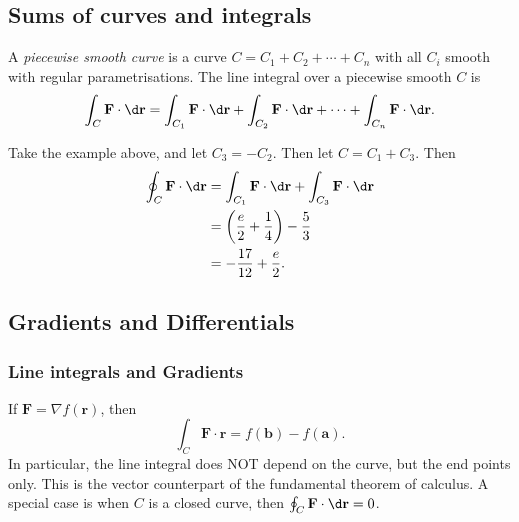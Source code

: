 \documentclass[a4paper]{article}
\begin{document}
\subsection{Sums of curves and integrals}
\begin{defi}
  A \emph{piecewise smooth curve} is a curve $C = C_1 + C_2 + \cdots + C_n$ with all $C_i$ smooth with regular parametrisations. The line integral over a piecewise smooth $C$ is
  \[
    \int_C \mathbf{F}\cdot \d \mathbf{r} = \int_{C_1} \mathbf{F}\cdot \d \mathbf{r} + \int_{C_2} \mathbf{F}\cdot \d \mathbf{r} + \cdots + \int_{C_n} \mathbf{F}\cdot \d \mathbf{r}.
  \]
\end{defi}

\begin{eg}
  Take the example above, and let $C_3 = -C_2$. Then let $C = C_1 + C_3$. Then
  \begin{align*}
    \oint _C \mathbf{F}\cdot \d \mathbf{r} &= \int_{C_1} \mathbf{F}\cdot \d \mathbf{r} + \int_{C_3} \mathbf{F}\cdot \d \mathbf{r}\\
    &= \left(\frac{e}{2} + \frac{1}{4}\right) - \frac{5}{3}\\
    &= -\frac{17}{12} + \frac{e}{2}.
  \end{align*}
  \begin{center}
  \end{center}
\end{eg}
\subsection{Gradients and Differentials}
\subsubsection{Line integrals and Gradients}
\begin{thm}
  If $\mathbf{F} = \nabla f(\mathbf{r})$, then
  \[
    \int _C \mathbf{F}\cdot \mathbf{r} = f(\mathbf{b}) - f(\mathbf{a}).
  \]
  In particular, the line integral does NOT depend on the curve, but the end points only. This is the vector counterpart of the fundamental theorem of calculus. A special case is when $C$ is a closed curve, then $\oint_C \mathbf{F}\cdot \d \mathbf{r} =0 $.
\end{thm}
\end{document}
